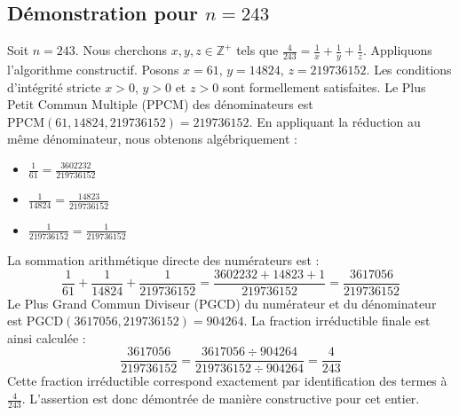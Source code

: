 \documentclass[11pt,a4paper]{article}
\begin{document}
\subsection{Démonstration pour $n = 243$}
Soit $n = 243$. Nous cherchons $x, y, z \in \mathbb{Z}^{+}$ tels que $\frac{4}{243} = \frac{1}{x} + \frac{1}{y} + \frac{1}{z}$.
Appliquons l'algorithme constructif. Posons $x = 61$, $y = 14824$, $z = 219736152$.
Les conditions d'intégrité stricte $x > 0$, $y > 0$ et $z > 0$ sont formellement satisfaites.
Le Plus Petit Commun Multiple (PPCM) des dénominateurs est $\text{PPCM}(61, 14824, 219736152) = 219736152$.
En appliquant la réduction au même dénominateur, nous obtenons algébriquement :
\begin{itemize}
    \item $\frac{1}{61} = \frac{3602232}{219736152}$
    \item $\frac{1}{14824} = \frac{14823}{219736152}$
    \item $\frac{1}{219736152} = \frac{1}{219736152}$
\end{itemize}
La sommation arithmétique directe des numérateurs est :
$$ \frac{1}{61} + \frac{1}{14824} + \frac{1}{219736152} = \frac{3602232 + 14823 + 1}{219736152} = \frac{3617056}{219736152} $$
Le Plus Grand Commun Diviseur (PGCD) du numérateur et du dénominateur est $\text{PGCD}(3617056, 219736152) = 904264$.
La fraction irréductible finale est ainsi calculée :
$$ \frac{3617056}{219736152} = \frac{3617056 \div 904264}{219736152 \div 904264} = \frac{4}{243} $$
Cette fraction irréductible correspond exactement par identification des termes à $\frac{4}{243}$. L'assertion est donc démontrée de manière constructive pour cet entier.
\end{document}

